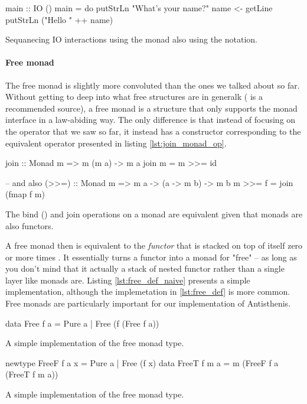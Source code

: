   \begin{code}
\begin{haskellcode}
main :: IO ()
main = do
  putStrLn "What's your name?"
  name <- getLine
  putStrLn ("Hello " ++ name)
\end{haskellcode}
    \caption{\label{lst:io_sugar_example}Sequanecing IO interactions
      using the  monad also using the  notation.}
  \end{code}

  \paragraph{Free monad}

  The free monad is slightly more convoluted than the ones we talked
  about so far. Without getting to deep into what free structures are in
  generalk (\cite{bartoszmilewskiDaoFunctionalProgramming} is a
  recommended source), a free monad is a structure that only supports
  the monad interface in a law-abiding way. The only difference is that
  instead of focusing on the \hask{>>=} operator that we saw so far, it
  instead has a constructor corresponding to the equivalent operator
   presented in listing \ref{lst:join_monad_op}.

  \begin{code}
\begin{haskellcode}
join :: Monad m => m (m a) -> m a
join m = m >>= id

-- and also
(>>=) :: Monad m => m a -> (a -> m b) -> m b
m >>= f = join (fmap f m)
\end{haskellcode}

    \caption{\label{lst:join_monad_op}The bind (\hask{>>=}) and join
      operations on a monad are equivalent given that monads are also
      functors.}
  \end{code}

  A free monad  then is equivalent to the \emph{functor}
   that is stacked on top of itself zero or more times . It essentially turns a functor into a monad for
  "free" -- as long as you don't mind that it actually a stack of nested
  functor rather than a single layer like monads are. Listing
  \ref{lst:free_def_naive} presents a simple implementation, although
  the implemetation in \ref{lst:free_def} is more common. Free monads
  are particularly important for our implementation of Antisthenis.

  \begin{code}
\begin{haskellcode}
data Free f a
  = Pure a
  | Free (f (Free f a))
\end{haskellcode}
    \caption{\label{lst:free_def_naive}A simple implementation of the free
      monad type.}
  \end{code}

  \begin{code}
\begin{haskellcode}
newtype FreeF f a x = Pure a | Free (f x)
data FreeT f m a = m (FreeF f a (FreeT f m a))
\end{haskellcode}
    \caption{\label{lst:free_def}A simple implementation of the free
      monad type.}
  \end{code}
  
